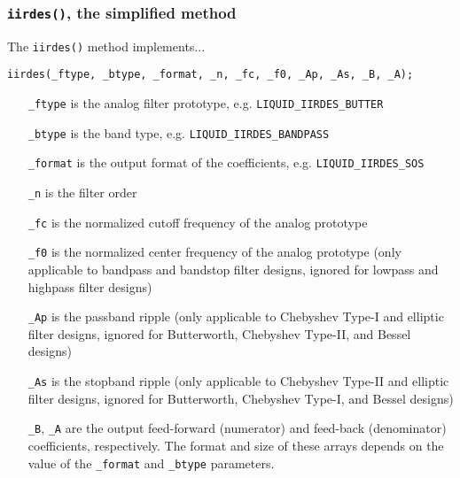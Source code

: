\subsubsection{{\tt iirdes()}, the simplified method}
\label{module:filter:iirdes:iirdes}
The {\tt iirdes()} method implements...

\begin{verbatim}
iirdes(_ftype, _btype, _format, _n, _fc, _f0, _Ap, _As, _B, _A);
\end{verbatim}

\begin{itemize}
\item[{\tt \_ftype}]
    is the analog filter prototype, e.g. {\tt LIQUID\_IIRDES\_BUTTER}
\item[{\tt \_btype}]
    is the band type, e.g. {\tt LIQUID\_IIRDES\_BANDPASS}
\item[{\tt \_format}]
    is the output format of the coefficients, e.g. {\tt LIQUID\_IIRDES\_SOS}
\item[{\tt \_n}]
    is the filter order
\item[{\tt \_fc}]
    is the normalized cutoff frequency of the analog prototype
\item[{\tt \_f0}]
    is the normalized center frequency of the analog prototype (only
    applicable to bandpass and bandstop filter designs, ignored for lowpass
    and highpass filter designs)
\item[{\tt \_Ap}]
    is the passband ripple (only applicable to Chebyshev Type-I and elliptic
    filter designs, ignored for Butterworth, Chebyshev Type-II, and Bessel
    designs)
\item[{\tt \_As}]
    is the stopband ripple (only applicable to Chebyshev Type-II and elliptic
    filter designs, ignored for Butterworth, Chebyshev Type-I, and Bessel
    designs)
\item[{\tt \_B}, {\tt \_A}]
    are the output feed-forward (numerator) and feed-back (denominator)
    coefficients, respectively.
    The format and size of these arrays depends on the value of the
    {\tt \_format} and {\tt \_btype} parameters.
\end{itemize}

